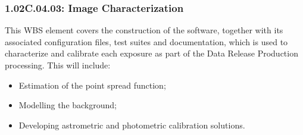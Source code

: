 \subsubsection*{1.02C.04.03: Image Characterization}

This WBS element covers the construction of the software, together with
its associated configuration files, test suites and documentation, which
is used to characterize and calibrate each exposure as part of the Data
Release Production processing. This will include:

\begin{itemize}

\item{Estimation of the point spread function;}
\item{Modelling the background;}
\item{Developing astrometric and photometric calibration solutions.}

\end{itemize}
